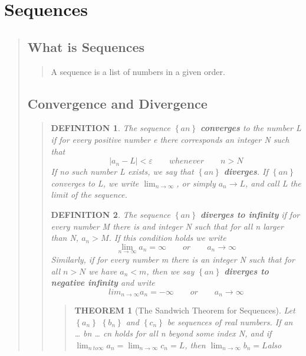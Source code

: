 \documentclass{report}
\newtheorem{theorem}{THEOREM}
\newtheorem*{definition}{DEFINITION}
\begin{document}
\section{Sequences}
\begin{quote}

	\subsection{What is Sequences}
	\begin{quote}
		A sequence is a list of numbers in a given order.
	\end{quote}

	\subsection{Convergence and Divergence}
	\begin{quote}

		\begin{definition}
			The sequence $\left \{ an \right \}$ \textbf{converges} to the number L if for every positive number e there corresponds an integer N such that 
			$$\left | a_n - L\right | < \varepsilon \qquad whenever\qquad n > N$$
			If no such number L exists, we say that $\left \{ an \right \}$ \textbf{diverges}. 
			If $\left \{ an \right \}$ converges to L, we write $\lim_{n \to \infty}$, or simply $a_n \to L$, and call L the limit of the sequence.
		\end{definition}

		\begin{definition}
			The sequence $\left \{ an \right \}$ \textbf{diverges to infinity} if for every number M there is and integer N such that for all n larger than N, $a_n>M$. If this condition holds we write
			$$\lim_{n \to \infty} a_n = \infty \qquad or\qquad a_n \to \infty$$
			Similarly, if for every number m there is an integer N such that for all $n > N$ we have $a_n < m$, then we say $\left \{ an \right \}$ \textbf{diverges to negative infinity} and write 
			$$lim_{n \to \infty}a_n = -\infty\qquad or \qquad a_n\to\infty$$
		\end{definition}

		\begin{quote}
			\begin{theorem}[The Sandwich Theorem for Sequences]
				\mbox{}\par
				Let $\left \{ a_n \right \}$ $ \left\{ b_n \right \}$ and $ \left \{ c_n \right \}$ be sequences of real numbers. If an … bn … cn holds for all n beyond some index N, and if $\lim_{n\ to \infty} a_n = \lim_{n \to \infty} c_n = L$, then $\lim_{n \to \infty}b_n = L$also
			\end{theorem}
		\end{quote}



\end{quote}
\end{quote}
\end{document}
